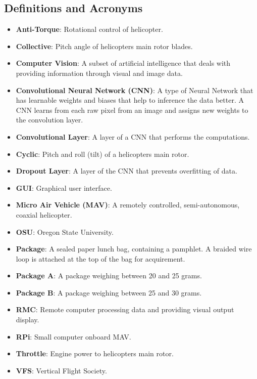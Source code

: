 \documentclass[onecolumn, oneside, letterpaper, draftclsnofoot, 10pt, compsoc]{IEEEtran}
\begin{document}
\subsection{Definitions and Acronyms}
\begin{itemize}
\item \textbf{Anti-Torque}: Rotational control of helicopter.
\item \textbf{Collective}: Pitch angle of helicopter\textquotesingle s main rotor blades.
\item \textbf{Computer Vision}: A subset of artificial intelligence that deals with providing information through visual and image data.
\item \textbf{Convolutional Neural Network (CNN)}: A type of Neural Network that has learnable weights and biases that help to inference the data better. A CNN learns from each raw pixel from an image and assigns new weights to the convolution layer.
\item \textbf{Convolutional Layer}: A layer of a CNN that performs the computations.
\item \textbf{Cyclic}: Pitch and roll (tilt) of a helicopter\textquotesingle s main rotor.
\item \textbf{Dropout Layer}: A layer of the CNN that prevents overfitting of data.
\item \textbf{GUI}: Graphical user interface.
\item \textbf{Micro Air Vehicle (MAV)}: A remotely controlled, semi-autonomous, coaxial helicopter.
\item \textbf{OSU}: Oregon State University.
\item \textbf{Package}: A sealed paper lunch bag, containing a pamphlet. A braided wire loop is attached at the top of the bag for acquirement.
\item \textbf{Package A}: A package weighing between 20 and 25 grams.
\item \textbf{Package B}: A package weighing between 25 and 30 grams.
\item \textbf{RMC}: Remote computer processing data and providing visual output display.
\item \textbf{RPi}: Small computer onboard MAV.
\item \textbf{Throttle}: Engine power to helicopter\textquotesingle s main rotor.
\item \textbf{VFS}: Vertical Flight Society.

\end{itemize}
\end{document}
